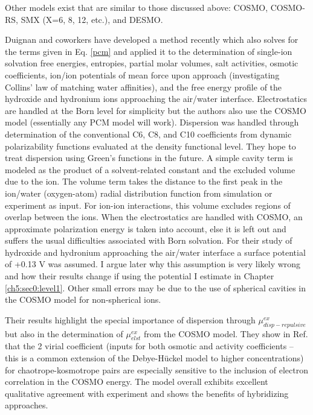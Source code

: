 \begin{intro}
    Other models exist that are similar to those discussed above: COSMO, COSMO-RS, SMX (X=6, 8, 12, etc.), and DESMO\cite{lange2011simple}.
    
    Duignan and coworkers have developed a method recently which also solves for the terms given in Eq. 
    \ref{pcm} and applied it to the determination of single-ion solvation free energies, entropies, partial molar volumes, salt activities, osmotic coefficients, ion/ion potentials
    of mean force upon approach (investigating Collins' law of matching water affinities), and the free energy profile of the hydroxide and hydronium ions approaching the air/water 
    interface\cite{duignan2013continuum1,duignan2013continuum2,duignan2014collins,duignan2014ion,duignan2015hydronium,duignan2016ions}. Electrostatics are handled at the Born 
    level for simplicity but the authors also use the COSMO model (essentially any PCM model will work). Dispersion was handled through determination of the conventional C6, C8,
    and C10 coefficients from dynamic polarizability functions evaluated at the density functional level. They hope to treat dispersion using Green's functions in the future. A 
    simple cavity term is modeled as the product of a solvent-related constant and the excluded volume due to the ion. The volume term takes the distance to the first peak in
    the ion/water (oxygen-atom) radial distribution function from simulation or experiment as input. For ion-ion interactions, this volume excludes regions of overlap between the 
    ions. When the electrostatics are handled with COSMO, an approximate polarization energy is taken into account, else it is left out and suffers the usual difficulties associated 
    with Born solvation. For their study of hydroxide and hydronium approaching the air/water interface a surface potential of +0.13 V was assumed\cite{duignan2015hydronium}. I argue later
    why this assumption is very likely wrong and how their results change if using the potential I estimate in Chapter \ref{ch5:sec0:level1}. Other small errors may be due to the
    use of spherical cavities in the COSMO model for non-spherical ions. 
    
    Their results highlight the special importance of dispersion through $\mu^{ex}_{disp-repulsive}$ but also in the determination of $\mu^{ex}_{elst}$ from the COSMO model. 
    They show in Ref. \cite{duignan2014ion} that the 2 virial coefficient (inputs for both osmotic and activity coefficients -- this is a common extension of the Debye-H\"{u}ckel
    model to higher concentrations) for chaotrope-kosmotrope pairs are especially sensitive to the inclusion of electron correlation in the COSMO energy. The model overall 
    exhibits excellent qualitative agreement with experiment and shows the benefits of hybridizing approaches.
   

\end{intro}
